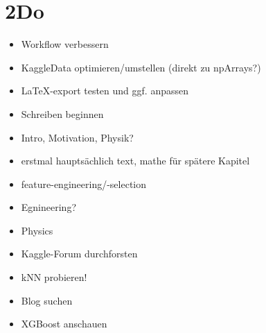












    
    
    

    
    \section{2Do}\label{do}

\begin{itemize}
\tightlist
\item
  Workflow verbessern
\item
  KaggleData optimieren/umstellen (direkt zu npArrays?)
\item
  LaTeX-export testen und ggf. anpassen
\item
  Schreiben beginnen
\item
  Intro, Motivation, Physik?
\item
  erstmal hauptsächlich text, mathe für spätere Kapitel
\item
  feature-engineering/-selection
\item
  Egnineering?
\item
  Physics
\item
  Kaggle-Forum durchforsten
\item
  kNN probieren!
\item
  Blog suchen
\item
  XGBoost anschauen
\end{itemize}


{\par%
\vspace{-1\baselineskip}%
}%
\begin{notebookcell}[]%
\begin{addmargin}[\cellleftmargin]{0em}%
{\smaller%
\par%
%
\vspace{-1\smallerfontscale}%
\begin{Verbatim}[commandchars=\\\{\}]

\end{Verbatim}
%
\par%
\vspace{-1\smallerfontscale}}%
\end{addmargin}
\end{notebookcell}



    
    
    
